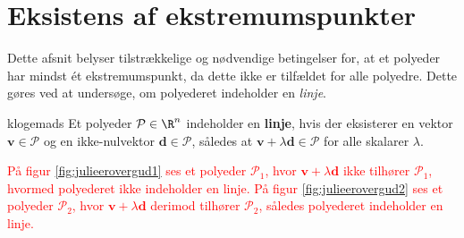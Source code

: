 \section{Eksistens af ekstremumspunkter}
%
Dette afsnit belyser tilstrækkelige og nødvendige betingelser for, at et polyeder har mindst ét ekstremumspunkt, da dette ikke er tilfældet for alle polyedre. 
Dette gøres ved at undersøge, om polyederet indeholder en \textit{linje}.
%
\begin{defn}{}{klogemads}
Et polyeder $\mathcal{P} \in \R^n$ indeholder en \textbf{linje}, hvis der eksisterer en vektor $\textbf{v} \in \mathcal{P}$ og en ikke-nulvektor $\textbf{d} \in \mathcal{P}$, således at $\textbf{v} + \lambda \textbf{d} \in \mathcal{P}$ for alle skalarer $\lambda$.
\end{defn}
\noindent
%
\textcolor{red}{
På figur \ref{fig:julieerovergud1} ses et polyeder $\mathcal{P}_1$, hvor $\mathbf{v} + \lambda \mathbf{d}$ ikke tilhører $\mathcal{P}_1$, hvormed polyederet ikke indeholder en linje. 
På figur \ref{fig:julieerovergud2} ses et polyeder $\mathcal{P}_2$, hvor $\mathbf{v} + \lambda \mathbf{d}$ derimod tilhører $\mathcal{P}_2$, således polyederet indeholder en linje.
}
\\\\
